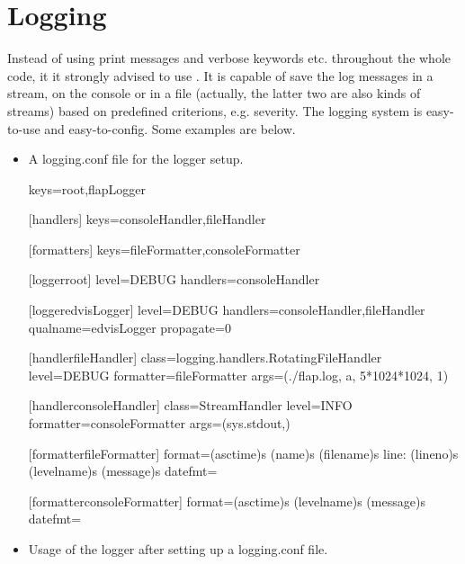 \documentclass[letterpaper,10pt,english]{sphinxmanual}
\begin{document}
\section{Logging}
\label{\detokenize{styleguide:logging}}
Instead of using print messages and verbose keywords etc. throughout the whole code, it it strongly advised to use . It is capable of save the log messages in a stream, on the console or in a file (actually, the latter two are also kinds of streams) based on predefined criterions, e.g. severity. The logging system is easy-to-use and easy-to-config. Some examples are below.
\begin{itemize}
\item {} 
A logging.conf file for the logger setup.

\begin{sphinxVerbatim}[commandchars=\\\{\}]
[loggers]
keys=root,flapLogger

[handlers]
keys=consoleHandler,fileHandler

[formatters]
keys=fileFormatter,consoleFormatter

[logger\PYGZus{}root]
level=DEBUG
handlers=consoleHandler

[logger\PYGZus{}edvisLogger]
level=DEBUG
handlers=consoleHandler,fileHandler
qualname=edvisLogger
propagate=0

[handler\PYGZus{}fileHandler]
class=logging.handlers.RotatingFileHandler
level=DEBUG
formatter=fileFormatter
args=(\PYGZsq{}./flap.log\PYGZsq{}, \PYGZsq{}a\PYGZsq{}, 5*1024*1024, 1)

[handler\PYGZus{}consoleHandler]
class=StreamHandler
level=INFO
formatter=consoleFormatter
args=(sys.stdout,)

[formatter\PYGZus{}fileFormatter]
format=\PYGZpc{}(asctime)s \PYGZhy{} \PYGZpc{}(name)s \PYGZhy{} \PYGZpc{}(filename)s \PYGZhy{} line: \PYGZpc{}(lineno)s \PYGZhy{}
\PYGZpc{}(levelname)s \PYGZhy{} \PYGZpc{}(message)s
datefmt=

[formatter\PYGZus{}consoleFormatter]
format=\PYGZpc{}(asctime)s \PYGZhy{} \PYGZpc{}(levelname)s \PYGZhy{} \PYGZpc{}(message)s
datefmt=
\end{sphinxVerbatim}

\item {} 
Usage of the logger after setting up a logging.conf file.

\begin{sphinxVerbatim}[commandchars=\\\{\}]
 
 


\end{sphinxVerbatim}
\end{itemize}
\end{document}
